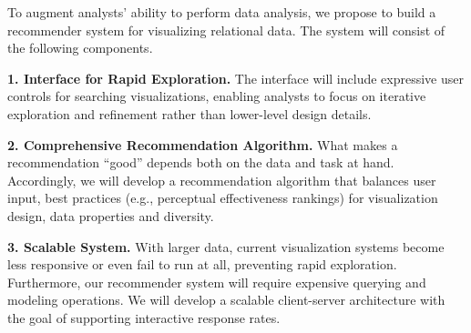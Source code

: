 To augment analysts’ ability to perform data analysis, we propose to build a recommender system for visualizing relational data. The system will consist of the following components.

\textbf{1. Interface for Rapid Exploration.}
The interface will include expressive user controls for searching visualizations, enabling analysts to focus on iterative exploration and refinement rather than lower-level design details.

\textbf{2. Comprehensive Recommendation Algorithm.}  What makes a recommendation “good” depends both on the data and task at hand. Accordingly, we will develop a recommendation algorithm that balances user input, best practices (e.g., perceptual effectiveness rankings) for visualization design, data properties and diversity.

\textbf{3. Scalable System.} With larger data, current visualization systems become less responsive or even fail to run at all, preventing rapid exploration.  Furthermore, our recommender system will require expensive querying and modeling operations. We will develop a scalable client-server architecture with the goal of supporting interactive response rates.

